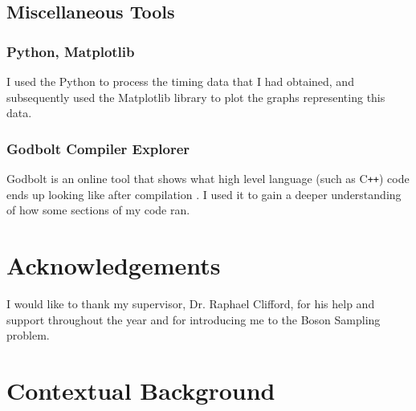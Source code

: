 \documentclass[ %
                    author={Manan Vaswani},
                supervisor={Dr. Raphael Clifford},
                    degree={MEng},
                     title={A multi-core CPU implementation of the classical Boson Sampling algorithm},
                  subtitle={},
                      type={},
                      year={2019} ]{dissertation}
\theoremstyle{plain}
\theoremstyle{definition}
\begin{document}
\section{Miscellaneous Tools}
\subsection{Python, Matplotlib}
I used the Python to process the timing data that I had obtained, and subsequently used the Matplotlib library to plot the graphs representing this data.

\subsection{Godbolt Compiler Explorer} \label{sec:godbolt}
Godbolt is an online tool that shows what high level language (such as C\texttt{++}) code ends up looking like after compilation \cite{god-bolt}. I used it to gain a deeper understanding of how some sections of my code ran.



\chapter*{Acknowledgements}

\noindent
I would like to thank my supervisor, Dr. Raphael Clifford, for his help and support throughout the year and for introducing me to the Boson Sampling problem.


%

\mainmatter


\chapter{Contextual Background}
\label{chap:context}
\end{document}
